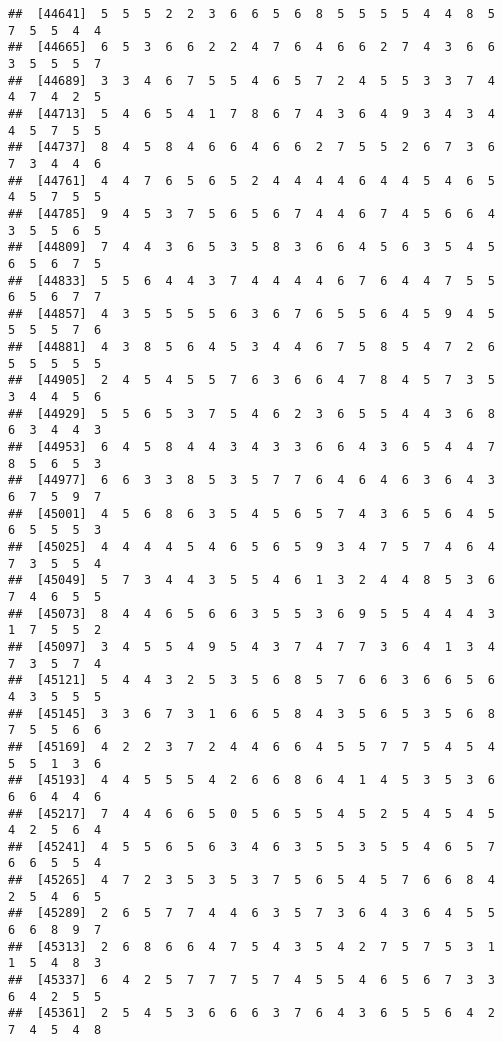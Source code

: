 \documentclass[
]{book}
\begin{document}
\begin{verbatim}
##  [44641]  5  5  5  2  2  3  6  6  5  6  8  5  5  5  5  4  4  8  5  7  5  5  4  4
##  [44665]  6  5  3  6  6  2  2  4  7  6  4  6  6  2  7  4  3  6  6  3  5  5  5  7
##  [44689]  3  3  4  6  7  5  5  4  6  5  7  2  4  5  5  3  3  7  4  4  7  4  2  5
##  [44713]  5  4  6  5  4  1  7  8  6  7  4  3  6  4  9  3  4  3  4  4  5  7  5  5
##  [44737]  8  4  5  8  4  6  6  4  6  6  2  7  5  5  2  6  7  3  6  7  3  4  4  6
##  [44761]  4  4  7  6  5  6  5  2  4  4  4  4  6  4  4  5  4  6  5  4  5  7  5  5
##  [44785]  9  4  5  3  7  5  6  5  6  7  4  4  6  7  4  5  6  6  4  3  5  5  6  5
##  [44809]  7  4  4  3  6  5  3  5  8  3  6  6  4  5  6  3  5  4  5  6  5  6  7  5
##  [44833]  5  5  6  4  4  3  7  4  4  4  4  6  7  6  4  4  7  5  5  6  5  6  7  7
##  [44857]  4  3  5  5  5  5  6  3  6  7  6  5  5  6  4  5  9  4  5  5  5  5  7  6
##  [44881]  4  3  8  5  6  4  5  3  4  4  6  7  5  8  5  4  7  2  6  5  5  5  5  5
##  [44905]  2  4  5  4  5  5  7  6  3  6  6  4  7  8  4  5  7  3  5  3  4  4  5  6
##  [44929]  5  5  6  5  3  7  5  4  6  2  3  6  5  5  4  4  3  6  8  6  3  4  4  3
##  [44953]  6  4  5  8  4  4  3  4  3  3  6  6  4  3  6  5  4  4  7  8  5  6  5  3
##  [44977]  6  6  3  3  8  5  3  5  7  7  6  4  6  4  6  3  6  4  3  6  7  5  9  7
##  [45001]  4  5  6  8  6  3  5  4  5  6  5  7  4  3  6  5  6  4  5  6  5  5  5  3
##  [45025]  4  4  4  4  5  4  6  5  6  5  9  3  4  7  5  7  4  6  4  7  3  5  5  4
##  [45049]  5  7  3  4  4  3  5  5  4  6  1  3  2  4  4  8  5  3  6  7  4  6  5  5
##  [45073]  8  4  4  6  5  6  6  3  5  5  3  6  9  5  5  4  4  4  3  1  7  5  5  2
##  [45097]  3  4  5  5  4  9  5  4  3  7  4  7  7  3  6  4  1  3  4  7  3  5  7  4
##  [45121]  5  4  4  3  2  5  3  5  6  8  5  7  6  6  3  6  6  5  6  4  3  5  5  5
##  [45145]  3  3  6  7  3  1  6  6  5  8  4  3  5  6  5  3  5  6  8  7  5  5  6  6
##  [45169]  4  2  2  3  7  2  4  4  6  6  4  5  5  7  7  5  4  5  4  5  5  1  3  6
##  [45193]  4  4  5  5  5  4  2  6  6  8  6  4  1  4  5  3  5  3  6  6  6  4  4  6
##  [45217]  7  4  4  6  6  5  0  5  6  5  5  4  5  2  5  4  5  4  5  4  2  5  6  4
##  [45241]  4  5  5  6  5  6  3  4  6  3  5  5  3  5  5  4  6  5  7  6  6  5  5  4
##  [45265]  4  7  2  3  5  3  5  3  7  5  6  5  4  5  7  6  6  8  4  2  5  4  6  5
##  [45289]  2  6  5  7  7  4  4  6  3  5  7  3  6  4  3  6  4  5  5  6  6  8  9  7
##  [45313]  2  6  8  6  6  4  7  5  4  3  5  4  2  7  5  7  5  3  1  1  5  4  8  3
##  [45337]  6  4  2  5  7  7  7  5  7  4  5  5  4  6  5  6  7  3  3  6  4  2  5  5
##  [45361]  2  5  4  5  3  6  6  6  3  7  6  4  3  6  5  5  6  4  2  7  4  5  4  8

\end{verbatim}
\end{document}
